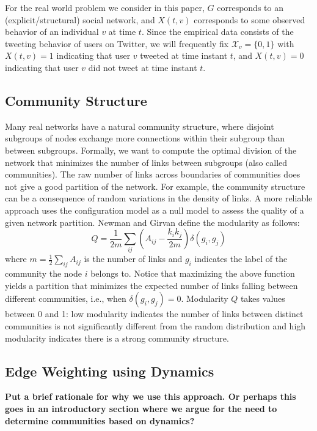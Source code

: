 \documentclass[12pt]{article}
\begin{document}
For the real world problem we consider in this paper, $G$ corresponds to an (explicit/structural) social network, and $X(t,v)$ corresponds to some observed behavior of an individual $v$ at time $t$. Since the empirical data consists of the tweeting behavior of users on Twitter, we will frequently fix $\mathcal{X}_{v} = \{0, 1\}$ with $X(t, v) = 1$ indicating that user $v$ tweeted at time instant $t$, and $X(t, v) = 0$ indicating that user $v$ did not tweet at time instant $t$.

\subsection{Community Structure}

Many real networks have a natural community structure, where disjoint subgroups of nodes exchange more connections within their subgroup than between subgroups. Formally, we want to compute the optimal division of the network that minimizes the number of links between subgroups (also called  communities). The raw number of links across boundaries of communities does not give a good partition of the  network. For example, the community structure can be a consequence of random variations in the density of links. A more reliable approach uses the configuration model \cite{newman2001random} as a null model to assess the quality of a given network partition. Newman and Girvan \cite{newman2004finding} define the modularity as follows:
\begin{equation}
Q = \frac{1}{2m} \sum_{ij} \left( A_{ij} -
\frac{k_i k_j}{2m} \right) \delta(g_i,g_j)
\label{eq.q}
\end{equation}
where $m = \frac{1}{2} \sum_{ij} A_{ij}$ is the number of links and $g_i$
indicates the label of the community the node $i$
belongs to. Notice that maximizing the above function yields a partition that minimizes the 
expected number of links falling between different communities, i.e., when 
$\delta(g_i, g_j) = 0$. 
Modularity $Q$ takes values between 0 and 1: low modularity indicates the number of links 
between distinct communities is not significantly different from the random distribution and high 
modularity indicates there is a strong community structure.

\subsection{Edge Weighting using Dynamics}

\textbf{Put a brief rationale for why we use this approach. Or perhaps this goes in an introductory section where we argue for the need to determine communities based on dynamics?}
\end{document}

